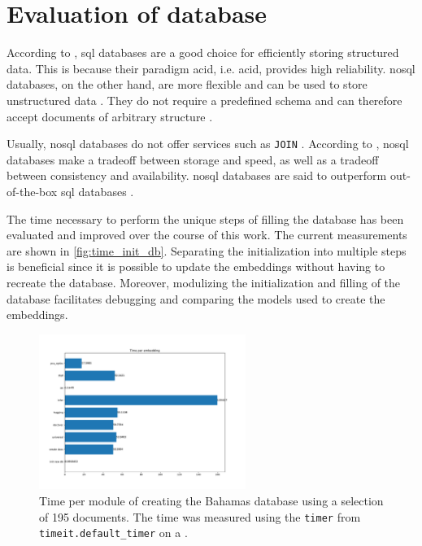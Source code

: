 \section{Evaluation of database}\label{subsec:evaluation-db}

According to \cite{flask_book2018}, \ac{sql} databases are a good choice for efficiently storing structured data.
This is because their paradigm \acs{acid}, i.e. \acl{acid}, provides high reliability.
\ac{nosql} databases, on the other hand, are more flexible and can be used to store unstructured data \cite{flask_book2018}.
They do not require a predefined schema and can therefore accept documents of arbitrary structure \cite{flask2018}.

Usually, \ac{nosql} databases do not offer services such as \texttt{JOIN} \cite{flask2018}.
According to \citeauthor{flask2018}, \ac{nosql} databases make a tradeoff between storage and speed, as well as a tradeoff between consistency and availability.
\ac{nosql} databases are said to outperform out-of-the-box \ac{sql} databases \cite{flask2018}.

The time necessary to perform the unique steps of filling the \databaseName{} database has been evaluated and improved over the course of this work.
The current measurements are shown in \autoref{fig:time_init_db}.
Separating the initialization into multiple steps is beneficial since it is possible to update the embeddings without having to recreate the database.
Moreover, modulizing the initialization and filling of the database facilitates debugging and comparing the models used to create the embeddings.

\begin{figure}[htp] %
    \centering
    \includegraphics[width=0.6\textwidth]{images/Elasticsearch/time_per_emb.pdf}
    \caption{Time per module of creating the Bahamas database using a selection of 195 documents.
    The time was measured using the \texttt{timer} from \texttt{timeit.default\_timer} on a \localMaschineStats{}.
    }
    \label{fig:time_init_db}
\end{figure}

